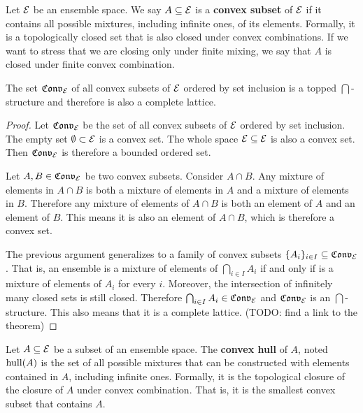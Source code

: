\begin{mathSection}
\begin{defn}
	Let $\mathcal{E}$ be an ensemble space. We say $A \subseteq \mathcal{E}$ is a \textbf{convex subset} of $\mathcal{E}$ if it contains all possible mixtures, including infinite ones, of its elements. Formally, it is a topologically closed set that is also closed under convex combinations. If we want to stress that we are closing only under finite mixing, we say that $A$ is closed under finite convex combination.
\end{defn}

\begin{prop}
	The set $\mathfrak{Conv}_{\mathcal{E}}$ of all convex subsets of $\mathcal{E}$ ordered by set inclusion is a topped $\bigcap$-structure and therefore is also a complete lattice.
\end{prop}

\begin{proof}
	Let $\mathfrak{Conv}_{\mathcal{E}}$ be the set of all convex subsets of $\mathcal{E}$ ordered by set inclusion. The empty set $\emptyset \subset \mathcal{E}$ is a convex set. The whole space $\mathcal{E} \subseteq \mathcal{E}$ is also a convex set. Then $\mathfrak{Conv}_{\mathcal{E}}$ is therefore a bounded ordered set.
	
	Let $A, B \in \mathfrak{Conv}_{\mathcal{E}}$ be two convex subsets. Consider $A \cap B$. Any mixture of elements in $A \cap B$ is both a mixture of elements in $A$ and a mixture of elements in $B$. Therefore any mixture of elements of $A \cap B$ is both an element of $A$ and an element of $B$. This means it is also an element of $A \cap B$, which is therefore a convex set.
	
	The previous argument generalizes to a family of convex subsets $\{A_i\}_{i \in I} \subseteq \mathfrak{Conv}_{\mathcal{E}}$. That is, an ensemble is a mixture of elements of $\bigcap_{i \in I} A_i$ if and only if is a mixture of elements of $A_i$ for every $i$. Moreover, the intersection of infinitely many closed sets is still closed. Therefore $\bigcap_{i \in I} A_i \in \mathfrak{Conv}_{\mathcal{E}}$ and $\mathfrak{Conv}_{\mathcal{E}}$ is an $\bigcap$-structure. This also means that it is a complete lattice. (TODO: find a link to the theorem)
\end{proof}

\begin{defn}
	Let $A \subseteq \mathcal{E}$ be a subset of an ensemble space. The \textbf{convex hull} of $A$, noted $\mathrm{hull}(A)$ is the set of all possible mixtures that can be constructed with elements contained in $A$, including infinite ones. Formally, it is the topological closure of the closure of $A$ under convex combination. That is, it is the smallest convex subset that contains $A$.
\end{defn}


\end{mathSection}
